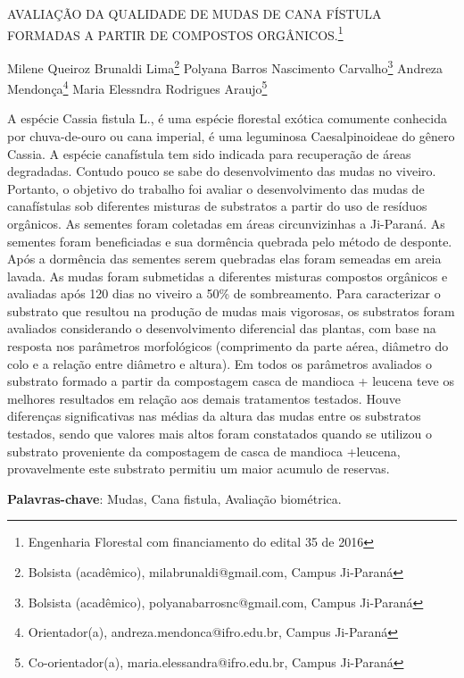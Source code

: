 \documentclass[article,12pt,onesidea,4paper,english,brazil]{abntex2}
\begin{document}
	
	
	\frenchspacing 
	
	\begin{center}
		\LARGE AVALIAÇÃO DA QUALIDADE DE MUDAS DE CANA FÍSTULA FORMADAS A PARTIR DE COMPOSTOS ORGÂNICOS.\footnote{Engenharia Florestal com financiamento do edital 35 de 2016}
		
		\normalsize
		Milene Queiroz Brunaldi Lima\footnote{Bolsista (acadêmico), milabrunaldi@gmail.com, Campus Ji-Paraná} 
		Polyana Barros Nascimento Carvalho\footnote{Bolsista (acadêmico), polyanabarrosnc@gmail.com, Campus Ji-Paraná} 
		Andreza Mendonça\footnote{Orientador(a), andreza.mendonca@ifro.edu.br, Campus Ji-Paraná} 
	Maria Elessndra Rodrigues Araujo\footnote{Co-orientador(a), maria.elessandra@ifro.edu.br, Campus Ji-Paraná} 
	\end{center}
	
	\noindent A espécie Cassia fistula L., é uma espécie florestal exótica comumente conhecida
	por chuva-de-ouro ou cana imperial, é uma leguminosa Caesalpinoideae do gênero
	Cassia. A espécie canafístula tem sido indicada para recuperação de áreas
	degradadas. Contudo pouco se sabe do desenvolvimento das mudas no viveiro.
	Portanto, o objetivo do trabalho foi avaliar o desenvolvimento das mudas de
	canafístulas sob diferentes misturas de substratos a partir do uso de resíduos
	orgânicos. As sementes foram coletadas em áreas circunvizinhas a Ji-Paraná. As
	sementes foram beneficiadas e sua dormência quebrada pelo método de desponte.
	Após a dormência das sementes serem quebradas elas foram semeadas em areia
	lavada. As mudas foram submetidas a diferentes misturas compostos orgânicos e
	avaliadas após 120 dias no viveiro a 50\% de sombreamento. Para caracterizar o
	substrato que resultou na produção de mudas mais vigorosas, os substratos foram
	avaliados considerando o desenvolvimento diferencial das plantas, com base na
	resposta nos parâmetros morfológicos (comprimento da parte aérea, diâmetro do
	colo e a relação entre diâmetro e altura). Em todos os parâmetros avaliados o
	substrato formado a partir da compostagem casca de mandioca + leucena teve os
	melhores resultados em relação aos demais tratamentos testados. Houve diferenças
	significativas nas médias da altura das mudas entre os substratos testados, sendo
	que valores mais altos foram constatados quando se utilizou o substrato proveniente
	da compostagem de casca de mandioca +leucena, provavelmente este substrato
	permitiu um maior acumulo de reservas.
	
	\vspace{\onelineskip}
	
	\noindent
	\textbf{Palavras-chave}: Mudas, Cana fistula, Avaliação biométrica.
	
\end{document}
